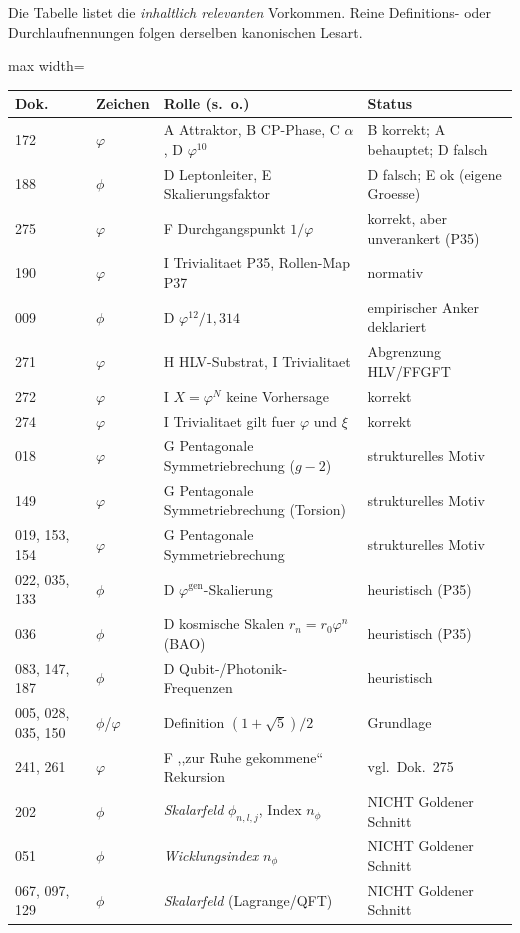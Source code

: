 Die Tabelle listet die \emph{inhaltlich relevanten} Vorkommen. Reine
Definitions- oder Durchlaufnennungen folgen derselben kanonischen Lesart.

\begin{center}
\begin{adjustbox}{max width=\textwidth}
\begin{tabular}{l l l l}
\hline
\textbf{Dok.} & \textbf{Zeichen} & \textbf{Rolle (s.\ o.)} & \textbf{Status} \\
\hline
172 & $\varphi$ & A Attraktor, B CP-Phase, C $\alpha$, D $\varphi^{10}$ & B korrekt; A behauptet; D falsch \\
188 & $\phi$ & D Leptonleiter, E Skalierungsfaktor & D falsch; E ok (eigene Groesse) \\
275 & $\varphi$ & F Durchgangspunkt $1/\varphi$ & korrekt, aber unverankert (P35) \\
190 & $\varphi$ & I Trivialitaet P35, Rollen-Map P37 & normativ \\
009 & $\phi$ & D $\varphi^{12}/1{,}314$ & empirischer Anker deklariert \\
271 & $\varphi$ & H HLV-Substrat, I Trivialitaet & Abgrenzung HLV/FFGFT \\
272 & $\varphi$ & I $X=\varphi^N$ keine Vorhersage & korrekt \\
274 & $\varphi$ & I Trivialitaet gilt fuer $\varphi$ und $\xi$ & korrekt \\
018 & $\varphi$ & G Pentagonale Symmetriebrechung ($g{-}2$) & strukturelles Motiv \\
149 & $\varphi$ & G Pentagonale Symmetriebrechung (Torsion) & strukturelles Motiv \\
019, 153, 154 & $\varphi$ & G Pentagonale Symmetriebrechung & strukturelles Motiv \\
022, 035, 133 & $\phi$ & D $\varphi^{\text{gen}}$-Skalierung & heuristisch (P35) \\
036 & $\phi$ & D kosmische Skalen $r_n=r_0\varphi^n$ (BAO) & heuristisch (P35) \\
083, 147, 187 & $\phi$ & D Qubit-/Photonik-Frequenzen & heuristisch \\
005, 028, 035, 150 & $\phi$/$\varphi$ & Definition $(1+\sqrt5)/2$ & Grundlage \\
241, 261 & $\varphi$ & F ,,zur Ruhe gekommene`` Rekursion & vgl.\ Dok.~275 \\
\hline
202 & $\phi$ & \emph{Skalarfeld} $\phi_{n,l,j}$, Index $n_\phi$ & NICHT Goldener Schnitt \\
051 & $\phi$ & \emph{Wicklungsindex} $n_\phi$ & NICHT Goldener Schnitt \\
067, 097, 129 & $\phi$ & \emph{Skalarfeld} (Lagrange/QFT) & NICHT Goldener Schnitt \\
\hline
\end{tabular}
\end{adjustbox}
\end{center}

